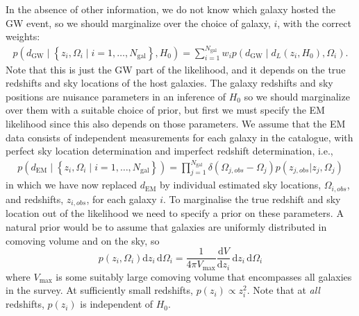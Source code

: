 \documentclass[modern]{aastex62}
\newcommand{\dd}{\mathrm{d}}
\newcommand{\dEM}{d_{\mathrm{EM}}}
\newcommand{\diff}[2]{\frac{\dd #1}{\dd #2}}
\newcommand{\dGW}{d_{\mathrm{GW}}}
\newcommand{\Ngal}{N_{\mathrm{gal}}}
\begin{document}
In the absence of other information, we do not know which galaxy hosted the
\ac{GW} event, so we should marginalize over the choice of galaxy, $i$, with the
correct weights:
%
\begin{multline}
    p\left( \dGW \mid \left\{ z_i, \Omega_i \mid i = 1, \ldots, \Ngal \right\}, H_0 \right) = \sum_{i = 1}^{\Ngal} w_i  p\left( \dGW \mid d_L\left( z_i, H_0 \right), \Omega_i \right).
\end{multline}
%
Note that this is just the GW part of the likelihood, and it depends on the true redshifts and sky locations of the host galaxies. The galaxy redshifts and sky positions are nuisance parameters in an inference of $H_0$ so we should marginalize over them with a suitable choice of
prior, but first we must specify the EM likelihood since this also depends on those parameters. We assume that the EM data consists of independent measurements for each galaxy in the catalogue, with perfect sky location determination and imperfect redshift determination, i.e.,
\begin{multline}
p\left( \dEM \mid \left\{ z_i, \Omega_i \mid i = 1, \ldots, \Ngal \right\} \right) = \prod_{j=1}^{\Ngal} \delta(\Omega_{j,obs}-\Omega_j) p(z_{j,obs} | z_j, \Omega_j)
\end{multline}
in which we have now replaced $\dEM$ by individual estimated sky locations, $\Omega_{i,obs}$, and redshifts, $z_{i,obs}$, for each galaxy $i$. To marginalise the true redshift and sky location out of the likelihood we need to specify a prior on these parameters. A natural prior would be to assume that galaxies are uniformly distributed in comoving volume and on the sky, so
%
\begin{equation}
    p\left( z_i, \Omega_i \right) \dd z_i \, \dd \Omega_i = \frac{1}{4\pi V_\mathrm{max}} \diff{V}{z_i} \, \dd z_i \, \dd \Omega_i
\end{equation}
%
where $V_\mathrm{max}$ is some suitably large comoving volume that encompasses
all galaxies in the survey.  At sufficiently small redshifts, $p\left( z_i
\right) \propto z_i^2$.  Note that at \emph{all} redshifts, $p\left( z_i
\right)$ is independent of $H_0$.
\end{document}
